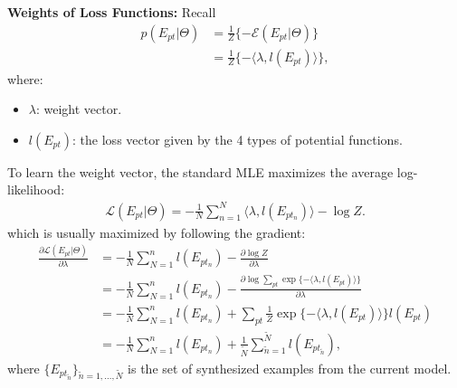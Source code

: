 \documentclass[10pt]{article}
\begin{document}
\textbf{Weights of Loss Functions:} Recall
%
\begin{align}
  p(E_{pt} \vert \Theta) &= \frac{1}{Z} \{-\mathcal{E}(E_{pt} \vert \Theta)\} \label{eq:11} \\
                         &= \frac{1}{Z} \{-\langle \lambda, l(E_{pt}) \rangle\}, \label{eq:12}
\end{align}
%
where:
%
\begin{itemize}
  \item $\lambda$: weight vector.
  \item $l(E_{pt})$: the loss vector given by the 4 types of potential functions.
\end{itemize}

To learn the weight vector, the standard MLE maximizes the average
log-likelihood:
%
\begin{align}
  \label{eq:13}
  \mathcal{L}(E_{pt} \vert \Theta) = -\frac{1}{N} \sum^N_{n=1} \langle \lambda, l(E_{pt_n}) \rangle - \log Z.
\end{align}
%
which is usually maximized by following the gradient:
%
\begin{align}
  \frac{\partial \mathcal{L}(E_{pt} \vert \Theta)}{\partial \lambda} &= -\frac{1}{N} \sum^n_{N=1} l(E_{pt_n}) - \frac{\partial \log Z}{\partial \lambda} \label{eq:14} \\
                                                                     &= -\frac{1}{N} \sum^n_{N=1} l(E_{pt_n}) - \frac{\partial \log \sum_{pt} \exp \{-\langle \lambda, l(E_{pt}) \rangle\}}{\partial \lambda} \label{eq:15} \\
                                                                     &= -\frac{1}{N} \sum^n_{N=1} l(E_{pt_n}) + \sum_{pt} \frac{1}{Z} \exp \{-\langle \lambda, l(E_{pt}) \rangle\} l(E_{pt}) \label{eq:16} \\
                                                                     &= -\frac{1}{N} \sum^n_{N=1} l(E_{pt_n}) + \frac{1}{\widetilde{N}} \sum^{\widetilde{N}}_{\widetilde{n}=1} l(E_{pt_{\widetilde{n}}}), \label{eq:17}
\end{align}
%
where $\{E_{pt_{\widetilde{n}}}\} _{\widetilde{n}=1, \ldots, \widetilde{N}}$ is
the set of synthesized examples from the current model.
\end{document}
